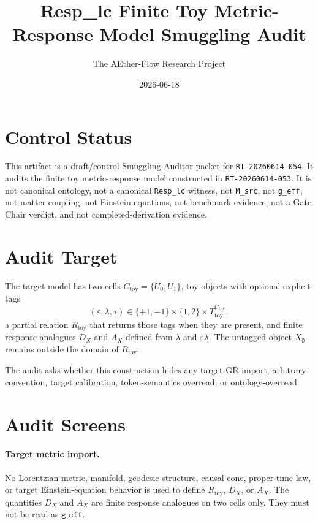 \documentclass[11pt]{article}
\title{Resp\_lc Finite Toy Metric-Response Model Smuggling Audit}
\author{The AEther-Flow Research Project}
\date{2026-06-18}
\begin{document}
\maketitle

\section*{Control Status}

This artifact is a draft/control Smuggling Auditor packet for
\texttt{RT-20260614-054}. It audits the finite toy metric-response
model constructed in \texttt{RT-20260614-053}. It is not canonical
ontology, not a canonical \texttt{Resp\_lc} witness, not
\texttt{M\_src}, not \texttt{g\_eff}, not matter coupling, not
Einstein equations, not benchmark evidence, not a Gate Chair verdict,
and not completed-derivation evidence.

\section{Audit Target}

The target model has two cells \(C_{\mathrm{toy}}=\{U_0,U_1\}\), toy
objects with optional explicit tags
\[
  (\varepsilon,\lambda,\tau)
  \in \{+1,-1\}\times\{1,2\}\times T_{\mathrm{toy}}^{C_{\mathrm{toy}}},
\]
a partial relation \(R_{\mathrm{toy}}\) that returns those tags when
they are present, and finite response analogues \(D_X\) and \(A_X\)
defined from \(\lambda\) and \(\varepsilon\lambda\). The untagged
object \(X_{\emptyset}\) remains outside the domain of
\(R_{\mathrm{toy}}\).

The audit asks whether this construction hides any target-GR import,
arbitrary convention, target calibration, token-semantics overread, or
ontology-overread.

\section{Audit Screens}

\paragraph{Target metric import.}
No Lorentzian metric, manifold, geodesic structure, causal cone,
proper-time law, or target Einstein-equation behavior is used to define
\(R_{\mathrm{toy}}\), \(D_X\), or \(A_X\). The quantities \(D_X\) and
\(A_X\) are finite response analogues on two cells only. They must not
be read as \(\texttt{g\_eff}\).
\end{document}
